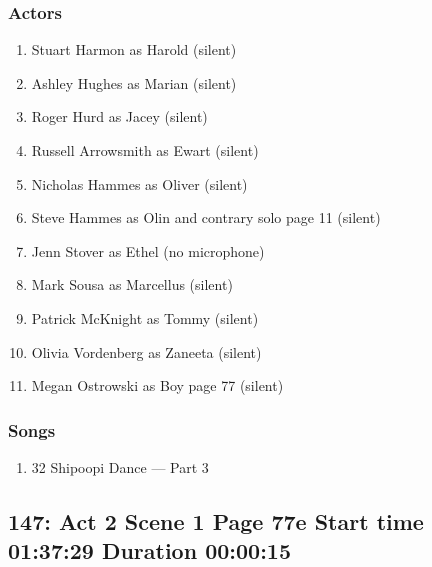 \subsubsection{Actors}
\begin{enumerate}
\item Stuart Harmon as Harold (silent)
\item Ashley Hughes as Marian (silent)
\item Roger Hurd as Jacey (silent)
\item Russell Arrowsmith as Ewart (silent)
\item Nicholas Hammes as Oliver (silent)
\item Steve Hammes as Olin and contrary solo page 11 (silent)
\item Jenn Stover as Ethel (no microphone)
\item Mark Sousa as Marcellus (silent)
\item Patrick McKnight as Tommy (silent)
\item Olivia Vordenberg as Zaneeta (silent)
\item Megan Ostrowski as Boy page 77 (silent)
\end{enumerate}

\subsubsection{Songs}
\begin{enumerate}
\item 32 Shipoopi Dance --- Part 3
\end{enumerate}
\subsection{147: Act 2 Scene 1 Page 77e Start time 01:37:29 Duration 00:00:15}

